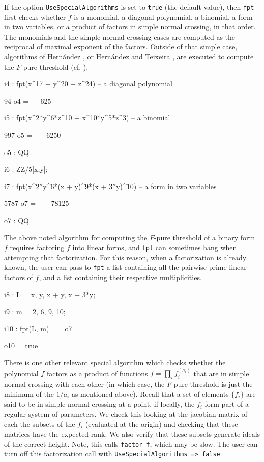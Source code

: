 \documentclass{amsart}
\begin{document}
If the option {\tt UseSpecialAlgorithms} is set to {\tt true} (the default value), then {\tt fpt} first checks whether $f$ is a monomial, a diagonal polynomial, a binomial, a form in two variables, or a product of factors in simple normal crossing, in that order.  The monomials and the simple normal crossing cases are computed as the reciprocal of maximal exponent of the factors.
Outside of that simple case, algorithms of Hern\'andez \cite{HernandezFInvariantsOfDiagonalHyp, HernandezFPureThresholdOfBinomial}, or Hern\'andez and Teixeira \cite{HernandezTeixeiraFThresholdFunctions},  are executed to compute the $F$-pure threshold (cf. \cite{ShibutaTakagiLCThresholds}).

{\small
{}
\begin{MyVerbatim}

i4 : fpt(x^17 + y^20 + z^24) -- a diagonal polynomial

      94
o4 = ---
     625

i5 : fpt(x^2*y^6*z^10 + x^10*y^5*z^3) -- a binomial

      997
o5 = ----
     6250

o5 : QQ

i6 : ZZ/5[x,y];

i7 : fpt(x^2*y^6*(x + y)^9*(x + 3*y)^10) -- a form in two variables

      5787
o7 = -----
     78125

o7 : QQ
\end{MyVerbatim}
}
\medspace

The above noted algorithm for computing the $F$-pure threshold of a binary form $f$ requires factoring $f$ into linear forms, and {\tt fpt} can sometimes hang when attempting that factorization. For this reason, when a factorization is already known, the user can pass to {\tt fpt} a list containing all the pairwise prime linear factors of $f$, and a list containing their respective multiplicities.

{\small
{}
\begin{MyVerbatim}

i8 : L = {x, y, x + y, x + 3*y};

i9 : m = {2, 6, 9, 10};

i10 : fpt(L, m) == o7

o10 = true
\end{MyVerbatim}
}
\medspace
There is one other relevant special algorithm which checks whether the polynomial $f$ factors as a product of functions $f = \prod_i f_i^(a_i)$ that are in simple normal crossing with each other (in which case, the $F$-pure threshold is just the minimum of the $1/a_i$ as mentioned above).  Recall that a set of elements $\{f_i\}$ are said to be in simple normal crossing at a point, if locally, the $f_i$ form part of a regular system of parameters.  We check this looking at the jacobian matrix of each the subsets of the $f_i$ (evaluated at the origin) and checking that these matrices have the expected rank.  We also verify that these subsets generate ideals of the correct height.  Note, this calls {\tt factor f}, which may be slow.  The user can turn off this factorization call with {\tt UseSpecialAlgorithms => false}
\end{document}
